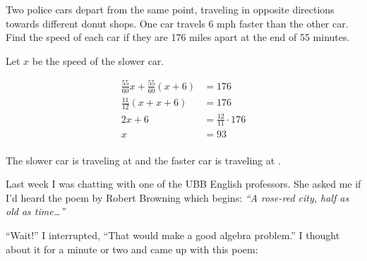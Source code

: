 \documentclass[letterpaper]{exam}
\begin{document}
\begin{questions}




    \question{}
      Two police cars depart from the same point, traveling in opposite directions towards different donut shops. One
      car travels 6 mph faster than the other car.  Find the speed of each car if they are 176 miles apart at the end of
      55 minutes.

      \begin{solution}
        Let $x$ be the speed of the slower car.

        \begin{align*}
          \frac{55}{60} x + \frac{55}{60}(x + 6) & = 176 \\
          \frac{11}{12} (x + x + 6)              & = 176 \\
          2x + 6                                 & = \frac{12}{11} \cdot 176 \\
          x                                      & = 93 \\
        \end{align*}

        The slower car is traveling at  and the faster car is traveling at .

      \end{solution}

    \ifprintanswers{}
    \else
      \newpage
    \fi

    \question{}
      Last week I was chatting with one of the UBB English professors.  She asked me if I'd heard the poem by Robert
      Browning which begins: {\em ``A rose-red city, half as old as time\ldots ''\/}

      ``Wait!'' I interrupted,  ``That would make a good algebra problem.''  I thought about it for a minute or two and
      came up with this poem:


\end{questions}
\end{document}
